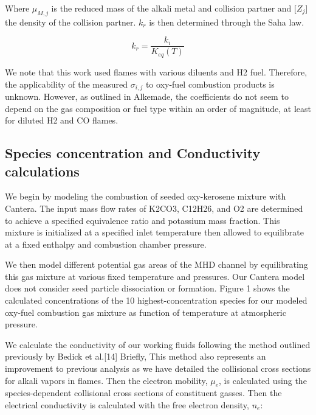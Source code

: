 Where \(\mu_{M,j}\) is the reduced mass of the alkali metal and collision partner and \(\lbrack Z_{j}\rbrack\) the density of the collision partner. \(k_{r}\) is then determined through the Saha law.

\[k_{r} = \frac{k_{i}}{K_{eq}(T)}\]

We note that this work used flames with various diluents and H2 fuel. Therefore, the applicability of the measured \(\sigma_{i,j}\) to oxy-fuel combustion products is unknown. However, as outlined in Alkemade, the coefficients do not seem to depend on the gas composition or fuel type within an order of magnitude, at least for diluted H2 and CO flames.

\hypertarget{species-concentration-and-conductivity-calculations}{%
\subsection{Species concentration and Conductivity calculations}\label{species-concentration-and-conductivity-calculations}}

We begin by modeling the combustion of seeded oxy-kerosene mixture with Cantera. The input mass flow rates of K2CO3, C12H26, and O2 are determined to achieve a specified equivalence ratio and potassium mass fraction. This mixture is initialized at a specified inlet temperature then allowed to equilibrate at a fixed enthalpy and combustion chamber pressure.

We then model different potential gas areas of the MHD channel by equilibrating this gas mixture at various fixed temperature and pressures. Our Cantera model does not consider seed particle dissociation or formation. Figure 1 shows the calculated concentrations of the 10 highest-concentration species for our modeled oxy-fuel combustion gas mixture as function of temperature at atmospheric pressure.

We calculate the conductivity of our working fluids following the method outlined previously by Bedick et al.{[}14{]} Briefly, This method also represents an improvement to previous analysis as we have detailed the collisional cross sections for alkali vapors in flames. Then the electron mobility, \(\mu_{e}\), is calculated using the species-dependent collisional cross sections of constituent gasses. Then the electrical conductivity is calculated with the free electron density, \(n_{e}\):

